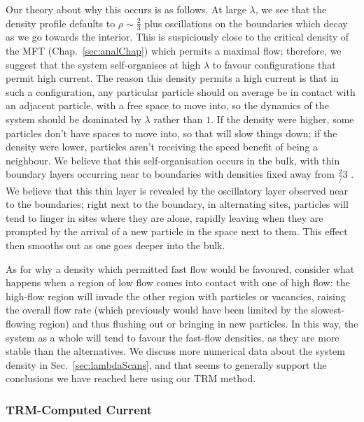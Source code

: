  Our theory about why this occurs is as follows.
 At large 
 $\lambda$, we see that the density profile defaults to $\rho\sim\frac{2}{3}$ plus oscillations on the 
 boundaries which decay as we go towards the interior. This is suspiciously close to the critical density
 of the MFT (Chap.~\ref{sec:analChap}) which permits a maximal flow; therefore, we suggest that the system
 self-organises at high $\lambda$ to favour configurations that permit high current. The reason this density permits a high current is that in such a configuration,
 any particular particle should on average be in contact with an adjacent particle, with a free space to move into, so the dynamics of the system should be dominated by $\lambda$ rather than $1$. If the density were
 higher, some particles don't have spaces to move into, so that will slow things down; if the density were 
 lower, particles aren't receiving the speed benefit of being a neighbour. We believe that this 
 self-organisation occurs in the bulk, with thin boundary layers occurring near to boundaries
 with densities fixed away from $\frac{2}/{3}$ .
 We believe that this thin layer is revealed by the oscillatory layer observed near to the boundaries; right next to the boundary, in alternating sites, particles will tend to
 linger in sites where they are alone, rapidly leaving when they are prompted by the arrival of a new particle in 
 the  space next to them. This effect then smooths out as one goes deeper into the bulk.
 
 As for why a density which permitted fast flow would be favoured, consider what happens when a 
 region of low flow comes into contact with one of high flow: the high-flow region will invade the
 other region with particles or vacancies, raising the overall flow rate (which previously would
 have been limited by the slowest-flowing region) and thus flushing out or bringing in new 
 particles. In this way, the system as a whole will tend to favour the fast-flow densities, as
 they are more stable than the alternatives. We discuss more numerical data about the system density
 in Sec.~\ref{sec:lambdaScans}, and that seems to generally support the conclusions we have reached
 here using our TRM method.
 
 \subsubsection{TRM-Computed Current} \label{sec:TRMLambdaScan}

